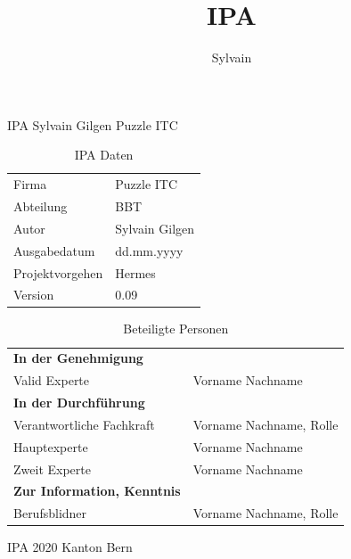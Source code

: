 \documentclass{report}
\author{Sylvain}
\title{IPA}
\begin{document}
\begin{titlepage}
  \Huge IPA Sylvain Gilgen Puzzle ITC\normalsize
\bigbreak
\begin{table}[h!]
    \begin{tabular}{|R{0.2\textwidth}|L{0.7\textwidth}|}
        \hline
          \\[12pt]
        \hline
        Firma & Puzzle ITC \\
        \hline
        Abteilung & BBT \\
        \hline
        Autor & Sylvain Gilgen \\
        \hline
        Ausgabedatum & dd.mm.yyyy \\
        \hline
        Projektvorgehen & Hermes \\
        \hline
        Version & 0.09 \\
        \hline
      \end{tabular}
      \caption{IPA Daten}
\end{table}
\begin{table}[!h]
    \begin{tabular}{|L{0.4\textwidth}|L{0.5\textwidth}|}
        \hline
          \\[12pt]
        \hline
        \textbf{In der Genehmigung} & \\
        \hline
        Valid Experte & Vorname Nachname \\
        \hline
        \textbf{In der Durchführung} & \\
        \hline
        Verantwortliche Fachkraft & Vorname Nachname, Rolle \\
        \hline
        Hauptexperte & Vorname Nachname \\
        \hline
        Zweit Experte & Vorname Nachname \\
        \hline
        \textbf{Zur Information, Kenntnis} & \\
        \hline
        Berufsblidner & Vorname Nachname, Rolle \\
        \hline
    \end{tabular}
    \caption{Beteiligte Personen}
\end{table}
\Huge IPA 2020 Kanton Bern
\end{titlepage}
\end{document}
